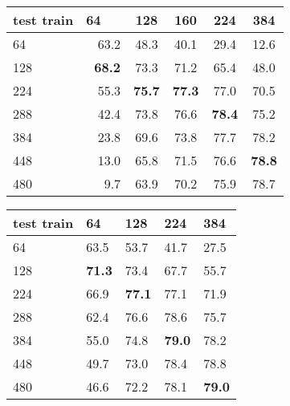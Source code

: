 \documentclass{article}
\begin{document}
\begin{table*}


{\small ~\hfill \begin{tabular}{lrcccc}
    \toprule
    test  train     & 64 \ \ & 128 & 160 & 224 & 384 \\
    \midrule
    64 & 63.2 & 48.3 & 40.1 & 29.4 & 12.6 \\
    128 & \textbf{68.2} & 73.3 &71.2 & 65.4 & 48.0 \\
    224 & 55.3 & \textbf{75.7} &\textbf{ 77.3}  & 77.0 & 70.5 \\
    288 & 42.4 & 73.8 & 76.6 & \textbf{78.4} & 75.2 \\
    384 & 23.8 & 69.6 & 73.8 & 77.7 & 78.2 \\
    448 & 13.0 & 65.8 &71.5 & 76.6 & \textbf{78.8} \\
    480 & 9.7 & 63.9 & 70.2 & 75.9 & 78.7 \\
    \bottomrule
  \end{tabular}\hfill
  \begin{tabular}{l|llll}
    \toprule
    test  train     & 64 & 128 & 224 & 384 \\
    \midrule
    64 & 63.5  & 53.7  & 41.7 & 27.5 \\
    128 & \textbf{71.3} & 73.4 & 67.7 & 55.7 \\
    224 & 66.9 & \textbf{77.1}  & 77.1 & 71.9 \\
    288 & 62.4 & 76.6 & 78.6 & 75.7 \\
    384 & 55.0 & 74.8 & \textbf{79.0} & 78.2 \\
    448 & 49.7 & 73.0 & 78.4 & 78.8 \\
    480 & 46.6 & 72.2 & 78.1 & \textbf{79.0} \\
    \bottomrule
\end{tabular} \hfill ~}
\smallskip
    \caption{
    \label{tab:baselines}
	Top-1 validation accuracy for different combinations of training and testing resolution. 
	Left: with the standard training procedure, (no finetuning, no adaptation of the ResNet-50).
	Right: with our data-driven adaptation strategy and test-time augmentations.
}
\end{table*}
\end{document}
